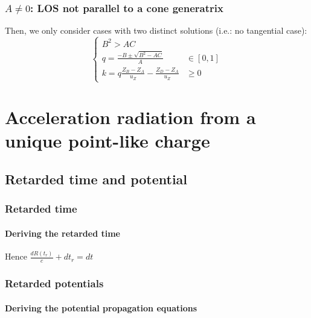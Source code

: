 \documentclass[a4paper,11pt,twoside,titlepage,openright]{book}
\numberwithin{equation}{section}
\begin{document}
\subsection{$A\neq 0$: LOS not parallel to a cone generatrix}

Then, we only consider cases with two distinct solutions (i.e.: no tangential case):
$$
\left\{
\begin{array}{ll}
B^2 > AC\\
q = \frac{-B \pm \sqrt{B^2-AC}}{A} & \in [0,1]\\
k = q\frac{Z_B-Z_A}{u_Z} - \frac{Z_D-Z_A}{u_Z} & \geq 0
\end{array}
\right.
$$





\appendix
\chapter{Acceleration radiation from a unique point-like charge}

\section{Retarded time and potential}
\subsection{Retarded time}

\subsubsection{Deriving the retarded time}
\label{Ap:RetardTime}

Hence $\frac{dR(t_r)}{c} + dt_r = dt$



\subsection{Retarded potentials}
\subsubsection{Deriving the potential propagation equations}
\label{Ap:PotentialPropagation}
\end{document}
